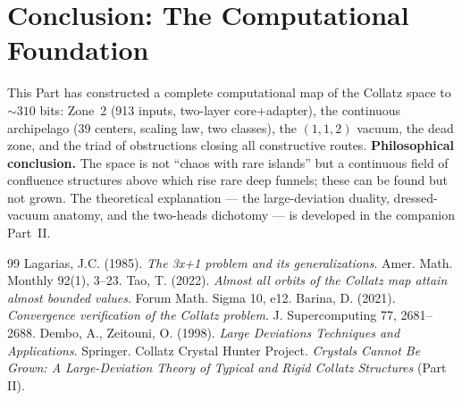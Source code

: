 \documentclass[12pt,a4paper]{article}
\theoremstyle{remark}
\begin{document}
\section{Conclusion: The Computational Foundation}
This Part has constructed a complete computational map of the Collatz space to
$\sim310$ bits: Zone~2 (913 inputs, two-layer core+adapter), the continuous
archipelago (39 centers, scaling law, two classes), the $(1,1,2)$ vacuum, the
dead zone, and the triad of obstructions closing all constructive routes.
\textbf{Philosophical conclusion.} The space is not ``chaos with rare islands''
but a continuous field of confluence structures above which rise rare deep
funnels; these can be found but not grown. The theoretical explanation --- the
large-deviation duality, dressed-vacuum anatomy, and the two-heads dichotomy ---
is developed in the companion Part~II.

\begin{thebibliography}{99}
 Lagarias, J.C. (1985). \textit{The 3x+1 problem and its generalizations}. Amer. Math. Monthly 92(1), 3--23.
 Tao, T. (2022). \textit{Almost all orbits of the Collatz map attain almost bounded values}. Forum Math. Sigma 10, e12.
 Barina, D. (2021). \textit{Convergence verification of the Collatz problem}. J. Supercomputing 77, 2681--2688.
 Dembo, A., Zeitouni, O. (1998). \textit{Large Deviations Techniques and Applications}. Springer.
 Collatz Crystal Hunter Project. \textit{Crystals Cannot Be Grown: A Large-Deviation Theory of Typical and Rigid Collatz Structures} (Part II).
\end{thebibliography}
\end{document}
